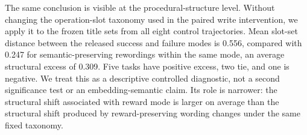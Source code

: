 The same conclusion is visible at the procedural-structure level. Without changing the operation-slot taxonomy used in the paired write intervention, we apply it to the frozen title sets from all eight control trajectories. Mean slot-set distance between the released success and failure modes is 0.556, compared with 0.247 for semantic-preserving rewordings within the same mode, an average structural excess of 0.309. Five tasks have positive excess, two tie, and one is negative. We treat this as a descriptive controlled diagnostic, not a second significance test or an embedding-semantic claim. Its role is narrower: the structural shift associated with reward mode is larger on average than the structural shift produced by reward-preserving wording changes under the same fixed taxonomy.
